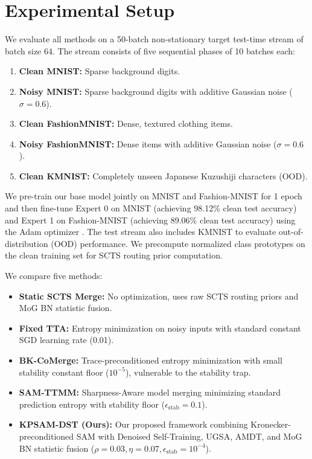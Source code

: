 \documentclass{article}
\theoremstyle{plain}
\theoremstyle{definition}
\theoremstyle{remark}
\begin{document}
\section{Experimental Setup}
\label{sec:experiments}
We evaluate all methods on a 50-batch non-stationary target test-time stream of batch size 64. The stream consists of five sequential phases of 10 batches each:
\begin{enumerate}
    \item \textbf{Clean MNIST:} Sparse background digits.
    \item \textbf{Noisy MNIST:} Sparse background digits with additive Gaussian noise ($\sigma = 0.6$).
    \item \textbf{Clean FashionMNIST:} Dense, textured clothing items.
    \item \textbf{Noisy FashionMNIST:} Dense items with additive Gaussian noise ($\sigma = 0.6$).
    \item \textbf{Clean KMNIST:} Completely unseen Japanese Kuzushiji characters (OOD).
\end{enumerate}

We pre-train our base model jointly on MNIST \cite{lecun1998gradient} and Fashion-MNIST \cite{xiao2017fashion} for 1 epoch and then fine-tune Expert 0 on MNIST (achieving 98.12\% clean test accuracy) and Expert 1 on Fashion-MNIST (achieving 89.06\% clean test accuracy) using the Adam optimizer \cite{kingma2014adam}. The test stream also includes KMNIST \cite{clanuwat2018deep} to evaluate out-of-distribution (OOD) performance. We precompute normalized class prototypes on the clean training set for SCTS routing prior computation.

We compare five methods:
\begin{itemize}
    \item \textbf{Static SCTS Merge:} No optimization, uses raw SCTS routing priors and MoG BN statistic fusion.
    \item \textbf{Fixed TTA:} Entropy minimization on noisy inputs with standard constant SGD learning rate (0.01).
    \item \textbf{BK-CoMerge:} Trace-preconditioned entropy minimization with small stability constant floor ($10^{-5}$), vulnerable to the stability trap.
    \item \textbf{SAM-TTMM:} Sharpness-Aware model merging minimizing standard prediction entropy with stability floor ($\epsilon_{\text{stab}} = 0.1$).
    \item \textbf{KPSAM-DST (Ours):} Our proposed framework combining Kronecker-preconditioned SAM with Denoised Self-Training, UGSA, AMDT, and MoG BN statistic fusion ($\rho = 0.03, \eta = 0.07, \epsilon_{\text{stab}} = 10^{-4}$).
\end{itemize}
\end{document}
